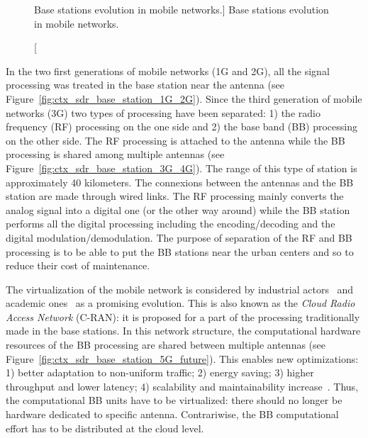 \begin{figure}[htp]
  \centering
  \quad{}
  \quad{}
  \caption
    [Base stations evolution in mobile networks.]
    {Base stations evolution in mobile networks.}
  \label{fig:ctx_sdr_base_station}
\end{figure}

In the two first generations of mobile networks (1G and 2G), all the signal
processing was treated in the base station near the antenna (see
Figure~\ref{fig:ctx_sdr_base_station_1G_2G}). Since the third generation of
mobile networks (3G) two types of processing have been separated: 1) the radio
frequency (RF) processing on the one side and 2) the base band (BB) processing
on the other side. The RF processing is attached to the antenna while the BB
processing is shared among multiple antennas (see
Figure~\ref{fig:ctx_sdr_base_station_3G_4G}). The range of this type of station
is approximately 40 kilometers. The connexions between the antennas and the BB
station are made through wired links. The RF processing mainly converts the
analog signal into a digital one (or the other way around) while the BB station
performs all the digital processing including the encoding/decoding and the
digital modulation/demodulation. The purpose of separation of the RF and BB
processing is to be able to put the BB stations near the urban centers and so to
reduce their cost of maintenance.

The virtualization of the mobile network is considered by industrial
actors~\cite{Huawei2013,Ericsson2015} and academic ones~\cite{Wubben2014,
Rost2014,Checko2015a} as a promising evolution. This is also known as the
\emph{Cloud Radio Access Network} (C-RAN): it is proposed for a part of
the processing traditionally made in the base stations. In this network
structure, the computational hardware resources of the BB processing are shared
between multiple antennas (see Figure~\ref{fig:ctx_sdr_base_station_5G_future}).
This enables new optimizations: 1) better adaptation to non-uniform traffic;
2) energy saving; 3) higher throughput and lower latency; 4) scalability and
maintainability increase~\cite{Checko2015a}. Thus, the computational BB units
have to be virtualized: there should no longer be hardware dedicated to specific
antenna. Contrariwise, the BB computational effort has to be distributed at the
cloud level.

